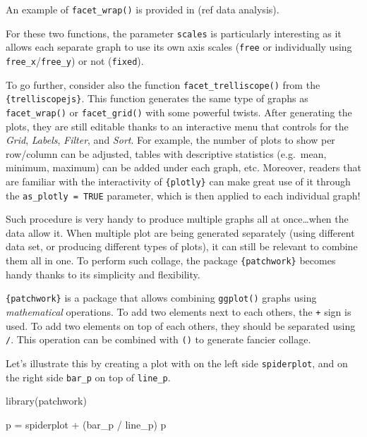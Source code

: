 \documentclass[
]{book}
\newenvironment{Shaded}{\begin{snugshade}}{\end{snugshade}}
\newcommand{\FunctionTok}[1]{\textcolor[rgb]{0.00,0.00,0.00}{#1}}
\newcommand{\NormalTok}[1]{#1}
\newcommand{\OtherTok}[1]{\textcolor[rgb]{0.56,0.35,0.01}{#1}}
\newcommand{\SpecialCharTok}[1]{\textcolor[rgb]{0.00,0.00,0.00}{#1}}
\begin{document}
An example of \texttt{facet\_wrap()} is provided in (ref data analysis).

For these two functions, the parameter \texttt{scales} is particularly interesting as it allows each separate graph to use its own axis scales (\texttt{free} or individually using \texttt{free\_x}/\texttt{free\_y}) or not (\texttt{fixed}).

To go further, consider also the function \texttt{facet\_trelliscope()} from the \texttt{\{trelliscopejs\}}.
This function generates the same type of graphs as \texttt{facet\_wrap()} or \texttt{facet\_grid()} with some powerful twists. After generating the plots, they are still editable thanks to an interactive menu that controls for the \emph{Grid}, \emph{Labels}, \emph{Filter}, and \emph{Sort}. For example, the number of plots to show per row/column can be adjusted, tables with descriptive statistics (e.g.~mean, minimum, maximum) can be added under each graph, etc. Moreover, readers that are familiar with the interactivity of \texttt{\{plotly\}} can make great use of it through the \texttt{as\_plotly\ =\ TRUE} parameter, which is then applied to each individual graph!

Such procedure is very handy to produce multiple graphs all at once\ldots when the data allow it.
When multiple plot are being generated separately (using different data set, or producing different types of plots), it can still be relevant to combine them all in one. To perform such collage, the package \texttt{\{patchwork\}} becomes handy thanks to its simplicity and flexibility.

\texttt{\{patchwork\}} is a package that allows combining \texttt{ggplot()} graphs using \emph{mathematical} operations.
To add two elements next to each others, the \texttt{+} sign is used. To add two elements on top of each others, they should be separated using \texttt{/}. This operation can be combined with \texttt{()} to generate fancier collage.

Let's illustrate this by creating a plot with on the left side \texttt{spiderplot}, and on the right side \texttt{bar\_p} on top of \texttt{line\_p}.

\begin{Shaded}
\begin{Highlighting}[]
\FunctionTok{library}\NormalTok{(patchwork)}

\NormalTok{p }\OtherTok{=}\NormalTok{ spiderplot }\SpecialCharTok{+}\NormalTok{ (bar\_p }\SpecialCharTok{/}\NormalTok{ line\_p)}
\NormalTok{p}
\end{Highlighting}
\end{Shaded}
\end{document}
